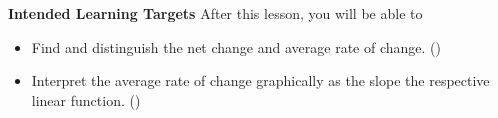 \documentclass[10pt]{article}
\begin{document}
\pagestyle{otherpages}
\thispagestyle{firstpage}



\textbf{Intended Learning Targets}
After this lesson, you will be able to 

\begin{itemize}
    \item Find and distinguish the net change and average rate of change. ()
    \item Interpret the average rate of change graphically as the slope the respective linear function. ()
\end{itemize}

\vspace{-0.5cm}

\hrulefill

\vspace{0.5cm}
\end{document}
